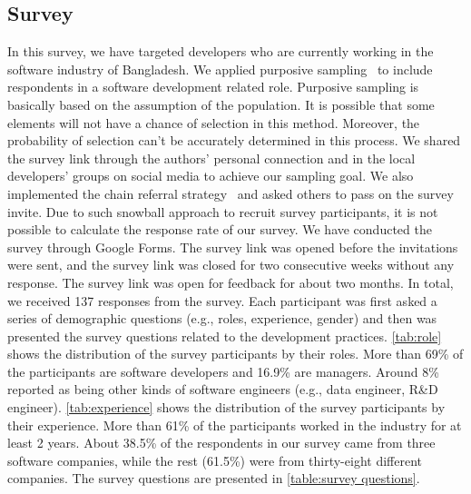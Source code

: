 \subsection{Survey}
\label{survey_participants}

In this survey, we have targeted developers who are currently working in the
software industry of Bangladesh. We applied purposive sampling~\cite{Vogt2005} to
include respondents in a software development related role. Purposive sampling
is basically based on the assumption of the population. It is possible that some
elements will not have a chance of selection in this method. Moreover, the
probability of selection can't be accurately determined in this process. We
shared the survey link through the authors' personal connection and in the local
developers' groups on social media to achieve our sampling goal. We also
implemented the chain referral strategy~\cite{creswell2013} and asked others to
pass on the survey invite. Due to such snowball approach to recruit survey participants, it is not possible to calculate the
response rate of our survey. We have conducted the survey through Google Forms. The survey link was opened
before the invitations were sent, and the survey link was closed for two
consecutive weeks without any response. The survey link was open for feedback
for about two months. In total, we
received 137 responses from the survey. Each participant was first asked a series of demographic questions (e.g., roles, experience, gender) and 
then was presented the survey questions related to the development practices. \tbl\ref{tab:role} shows the distribution of the survey participants by their roles. More than 69\% of the participants 
are software developers and 16.9\% are managers. Around 8\% reported as being other kinds of software engineers (e.g., data engineer, R\&D engineer). 
\tbl\ref{tab:experience} shows the distribution of the survey participants by their experience. More than 61\% of the participants worked in the
industry for at least 2 years. About 38.5\% of the respondents in our survey came from three software companies, while the rest (61.5\%) were from thirty-eight different companies. The survey questions are presented in \tbl\ref{table:survey questions}.
 



% 

